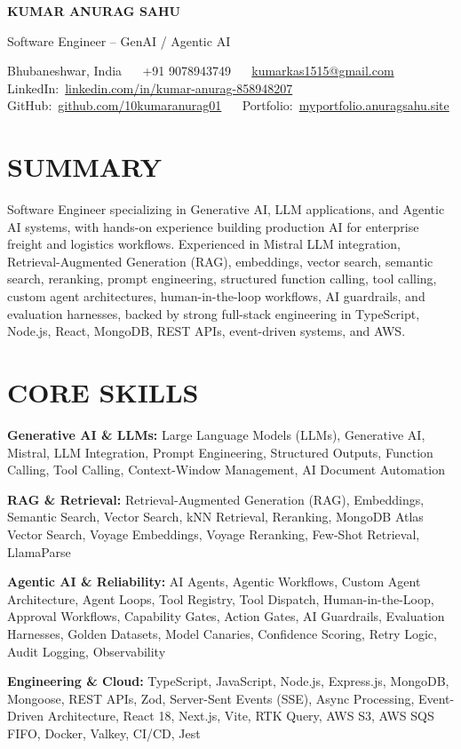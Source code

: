 \documentclass[letterpaper,9pt]{extarticle}
\newcommand{\skillline}[2]{\textbf{#1:} #2\par\vspace{2pt}}
\begin{document}
{\LARGE\bfseries\color{accent}KUMAR ANURAG SAHU}\par\vspace{1.5pt}
{\large\color{graytext}Software Engineer -- GenAI / Agentic AI}\par\vspace{2.5pt}
Bhubaneshwar, India ~\textbullet~ +91 9078943749 ~\textbullet~
\href{mailto:kumarkas1515@gmail.com}{\color{accent}kumarkas1515@gmail.com}\\[1.5pt]
{\color{graytext}LinkedIn:}~\href{https://www.linkedin.com/in/kumar-anurag-858948207/}%
{\color{accent}linkedin.com/in/kumar-anurag-858948207} ~\textbullet~
{\color{graytext}GitHub:}~\href{https://github.com/10kumaranurag01/}%
{\color{accent}github.com/10kumaranurag01} ~\textbullet~
{\color{graytext}Portfolio:}~\href{https://myportfolio.anuragsahu.site}%
{\color{accent}myportfolio.anuragsahu.site}

\section*{SUMMARY}
Software Engineer specializing in Generative AI, LLM applications, and Agentic AI systems, with hands-on
experience building production AI for enterprise freight and logistics workflows. Experienced in Mistral LLM
integration, Retrieval-Augmented Generation (RAG), embeddings, vector search, semantic search, reranking,
prompt engineering, structured function calling, tool calling, custom agent architectures, human-in-the-loop
workflows, AI guardrails, and evaluation harnesses, backed by strong full-stack engineering in TypeScript,
Node.js, React, MongoDB, REST APIs, event-driven systems, and AWS.

\section*{CORE SKILLS}
\skillline{Generative AI \& LLMs}{Large Language Models (LLMs), Generative AI, Mistral, LLM Integration,
Prompt Engineering, Structured Outputs, Function Calling, Tool Calling, Context-Window Management,
AI Document Automation}
\skillline{RAG \& Retrieval}{Retrieval-Augmented Generation (RAG), Embeddings, Semantic Search, Vector Search,
kNN Retrieval, Reranking, MongoDB Atlas Vector Search, Voyage Embeddings, Voyage Reranking, Few-Shot Retrieval,
LlamaParse}
\skillline{Agentic AI \& Reliability}{AI Agents, Agentic Workflows, Custom Agent Architecture, Agent Loops,
Tool Registry, Tool Dispatch, Human-in-the-Loop, Approval Workflows, Capability Gates, Action Gates,
AI Guardrails, Evaluation Harnesses, Golden Datasets, Model Canaries, Confidence Scoring, Retry Logic,
Audit Logging, Observability}
\skillline{Engineering \& Cloud}{TypeScript, JavaScript, Node.js, Express.js, MongoDB, Mongoose, REST APIs, Zod,
Server-Sent Events (SSE), Async Processing, Event-Driven Architecture, React 18, Next.js, Vite, RTK Query,
AWS S3, AWS SQS FIFO, Docker, Valkey, CI/CD, Jest}
\end{document}
